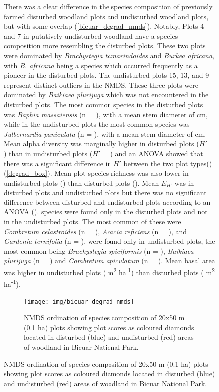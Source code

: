 \documentclass[diversity,article,submit,moreauthors,pdftex]{Definitions/mdpi}
\begin{document}
\begin{figure}[H]
There was a clear difference in the species composition of previously farmed disturbed woodland plots and undisturbed woodland plots, but with some overlap (\autoref{bicuar_degrad_nmds}). Notably, Plots 4 and 7 in putatively undisturbed woodland have a species composition more resembling the disturbed plots. These two plots were dominated by \textit{Brachystegia tamarindoides} and \textit{Burkea africana}, with \textit{B. africana} being a species which occurred frequently as a pioneer in the disturbed plots. The undisturbed plots 15, 13, and 9 represent distinct outliers in the NMDS. These three plots were dominated by \textit{Baikiaea plurijuga} which was not encountered in the disturbed plots. The most common species in the disturbed plots was \textit{Baphia massaiensis} (n = \nbmdegrad{}), with a mean stem diameter of \bmdbhdegrad{} cm, while in the undisturbed plots the most common species was \textit{Julbernardia paniculata} (n = \njpdegrad{}), with a mean stem diameter of \jpdbhbicuar{} cm. Mean alpha diversity was marginally higher in disturbed plots ($H'$ = \degradshannon{}) than in undisturbed plots ($H'$ = \bicuarsubshannon{}) and an ANOVA showed that there was a significant difference in $H'$ between the two plot types(\lmshannondegrad{}) (\autoref{degrad_box}). Mean plot species richness was also lower in undisturbed plots (\bicuarsubrich{}) than disturbed plots (\degradrich{}). Mean $E_{H'}$ was \degradequit{} in disturbed plots and \bicuarsubequit{} undisturbed plots but there was no significant difference between disturbed and undisturbed plots according to an ANOVA (\lmequitdegrad{}). \ndegradonlyspecies{} species were found only in the disturbed plots and not in the undisturbed plots. The most common of these were \textit{Combretum celastroides} (n = \nccdegrad{}), \textit{Acacia reficiens} (n = \nvrdegrad{}), and \textit{Gardenia ternifolia} (n = \ngtdegrad{}). \nbigonlyspecies{} were found only in undisturbed plots, the most common being \textit{Brachystegia spiciformis} (n = \nbsbig{}), \textit{Baikiaea plurijuga} (n = \nbpbig{}) and \textit{Combretum apiculatum} (n = \ncabig{}). Mean basal area was higher in undisturbed plots (\bicuarsubba{} m\textsuperscript{2} ha\textsuperscript{-1}) than disturbed plots (\degradba{} m\textsuperscript{2} ha\textsuperscript{-1}).

\begin{figure}[H]
\centering
	\texttt{[image: img/bicuar\_degrad\_nmds]}
	\caption{NMDS ordination of species composition of 20x50 m (0.1 ha) plots showing plot scores as coloured diamonds located in disturbed (blue) and undisturbed (red) areas of woodland in Bicuar National Park.}
	\label{bicuar_degrad_nmds}
\end{figure}


\end{figure}
\end{document}
